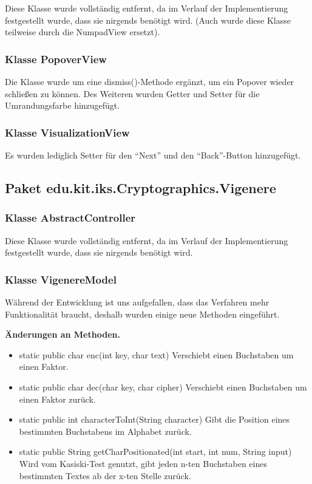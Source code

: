 \documentclass{article}
\begin{document}
	Diese Klasse wurde vollständig entfernt, da im Verlauf der Implementierung festgestellt wurde,
	dass sie nirgends benötigt wird. (Auch wurde diese Klasse teilweise durch die NumpadView ersetzt).

	\subsubsection{Klasse PopoverView}

	Die Klasse wurde um eine dismiss()-Methode ergänzt, um ein Popover wieder schließen zu können.
	Des Weiteren wurden Getter und Setter für die Umrandungsfarbe hinzugefügt.

	\subsubsection{Klasse VisualizationView}

	Es wurden lediglich Setter für den ``Next'' und den ``Back''-Button hinzugefügt.

  \subsection{Paket edu.kit.iks.Cryptographics.Vigenere}
    \subsubsection{Klasse AbstractController}
	Diese Klasse wurde vollständig entfernt, da im Verlauf der Implementierung festgestellt wurde,
	dass sie nirgends benötigt wird.
	
    \subsubsection{Klasse VigenereModel}
	Während der Entwicklung ist uns aufgefallen, dass das Verfahren mehr Funktionalität braucht, deshalb wurden einige neue Methoden eingeführt.\newline
           
    \textbf{Änderungen an Methoden.}
      \begin{itemize}
		\item static public char enc(int key, char text)\newline
              Verschiebt einen Buchstaben um einen Faktor.
        \item static public char dec(char key, char cipher)\newline
              Verschiebt einen Buchstaben um einen Faktor zurück.
		\item static public int characterToInt(String character)\newline
              Gibt die Position eines bestimmten Buchstabens im Alphabet zurück.
		\item static public String getCharPositionated(int start, int num, String input)\newline
              Wird vom Kasiski-Test genutzt, gibt jeden n-ten Buchstaben eines bestimmten Textes ab der x-ten Stelle zurück.			
      \end{itemize}
\end{document}
